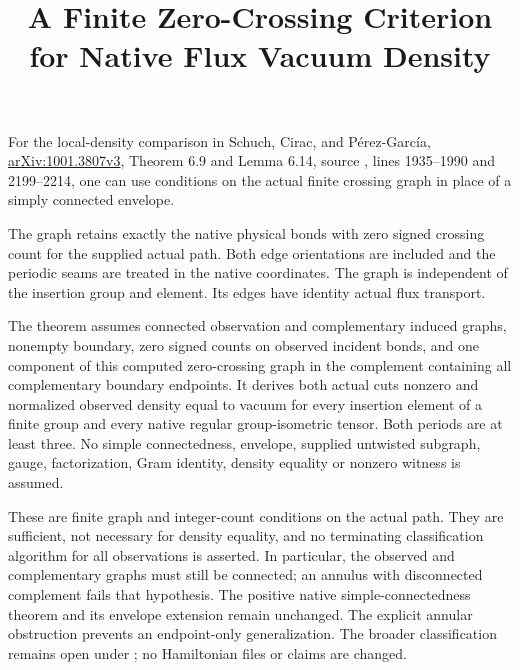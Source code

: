 \documentclass{article}
\title{A Finite Zero-Crossing Criterion for Native Flux Vacuum Density}
\author{}
\date{}
\begin{document}
\maketitle
{}

For the local-density comparison in Schuch, Cirac, and P\'erez-Garc\'ia,
\href{https://arxiv.org/abs/1001.3807v3}{arXiv:1001.3807v3}, Theorem 6.9
and Lemma 6.14, source , lines
1935--1990 and 2199--2214, one can use conditions on the actual finite
crossing graph in place of a simply connected envelope.

The graph  retains exactly
the native physical bonds with zero signed crossing count for the supplied
actual path. Both edge orientations are included and the periodic seams
are treated in the native coordinates. The graph is independent of the
insertion group and element. Its edges have identity actual flux transport.

The theorem
assumes connected observation and complementary induced graphs, nonempty
boundary, zero signed counts on observed incident bonds, and one component
of this computed zero-crossing graph in the complement containing all
complementary boundary endpoints. It derives both actual cuts nonzero and
normalized observed density equal to vacuum for every insertion element
of a finite group and every native regular group-isometric tensor.
Both periods are at least three. No simple connectedness, envelope,
supplied untwisted subgraph, gauge, factorization, Gram identity, density
equality or nonzero witness is assumed.

These are finite graph and integer-count conditions on the actual path.
They are sufficient, not necessary for density equality, and no terminating
classification algorithm for all observations is asserted. In particular,
the observed and complementary graphs must still be connected; an annulus
with disconnected complement fails that hypothesis. The positive native
simple-connectedness theorem and its envelope extension remain unchanged.
The explicit annular obstruction prevents an endpoint-only generalization.
The broader classification remains open under ; no
 Hamiltonian files or claims are changed.
\end{document}
